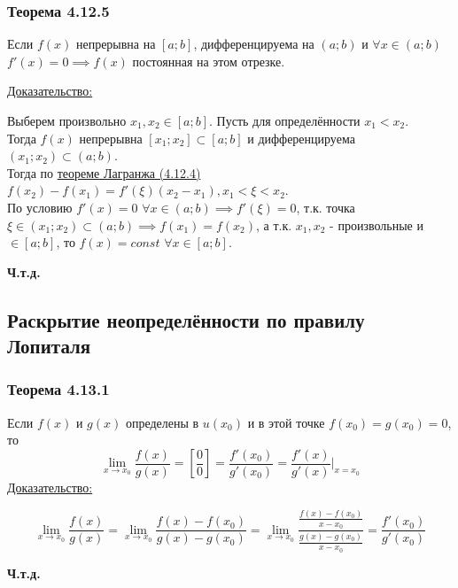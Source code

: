 \documentclass[12pt]{article}
\begin{document}
    \subsubsection*{Теорема 4.12.5}\label{th:4.12.5}
    Если $f(x)$ непрерывна на $[a;b]$, дифференцируема на $(a;b)$ и $\forall x \in (a;b)$ $f'(x) = 0 \implies f(x)$ постоянная на этом отрезке.\par\noindent
    \underline{Доказательство:}
    \begin{adjustwidth}{1.5em}{1.5em}
        Выберем произвольно $x_1, x_2 \in [a; b]$. Пусть для определённости $x_1 < x_2$.\\
        Тогда $f(x)$ непрерывна $[x_1;x_2] \subset [a;b]$ и дифференцируема $(x_1; x_2) \subset (a; b)$.\\
        Тогда по \hyperref[th:4.12.4]{теореме Лагранжа (4.12.4)} $f(x_2) - f(x_1) = f'(\xi)(x_2-x_1), x_1 < \xi < x_2$.\\
        По условию $f'(x) = 0$ $\forall x \in (a; b) \implies f'(\xi) = 0$, т.к. точка $\xi \in (x_1; x_2) \subset (a; b) \implies f(x_1) = f(x_2)$, а т.к. $x_1, x_2$ - произвольные и $\in [a; b]$, то $f(x) = const$ $\forall x \in [a;b]$.
        \begin{center}
            \textbf{Ч.т.д.}
        \end{center}
    \end{adjustwidth}

    \subsection{Раскрытие неопределённости по правилу Лопиталя}
    \subsubsection*{Теорема 4.13.1}\label{th:4.13.1}
    Если $f(x)$ и $g(x)$ определены в $u(x_0)$ и в этой точке $f(x_0) = g(x_0) = 0$, то
    \[ \lim_{x\to x_0}\frac{f(x)}{g(x)} = \left[\frac{0}{0}\right] = \frac{f'(x_0)}{g'(x_0)} = \frac{f'(x)}{g'(x)}\Big|_{x = x_0} \]
    \underline{Доказательство:}
    \begin{adjustwidth}{1.5em}{1.5em}
        \[ \lim_{x \to x_0}\frac{f(x)}{g(x)} = \lim_{x\to x_0}\frac{f(x) - f(x_0)}{g(x) - g(x_0)} = \lim_{x\to x_0} \frac{\frac{f(x)-f(x_0)}{x - x_0}}{\frac{g(x) - g(x_0)}{x - x_0}} = \frac{f'(x_0)}{g'(x_0)} \]
        \begin{center}
            \textbf{Ч.т.д.}
        \end{center}
    \end{adjustwidth}
    
\end{document}
